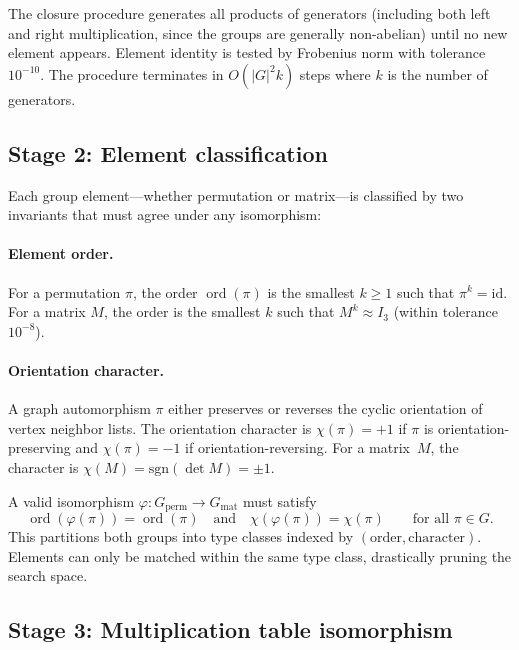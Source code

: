 \documentclass[11pt]{article}
\DeclareMathOperator{\ord}{ord}
\DeclareMathOperator{\det}{det}
\begin{document}
The closure procedure generates all products of generators (including
both left and right multiplication, since the groups are generally
non-abelian) until no new element appears.  Element identity is tested
by Frobenius norm with tolerance $10^{-10}$.  The procedure terminates
in $O(|G|^2 k)$ steps where $k$ is the number of generators.

\subsection{Stage 2: Element classification}
\label{sec:classification}

Each group element---whether permutation or matrix---is classified by
two invariants that must agree under any isomorphism:

\paragraph{Element order.}
For a permutation $\pi$, the order $\ord(\pi)$ is the smallest
$k \geq 1$ such that $\pi^k = \mathrm{id}$.  For a matrix $M$, the
order is the smallest $k$ such that $M^k \approx I_3$ (within
tolerance~$10^{-8}$).

\paragraph{Orientation character.}
A graph automorphism $\pi$ either preserves or reverses the cyclic
orientation of vertex neighbor lists.  The orientation character is
$\chi(\pi) = +1$ if $\pi$ is orientation-preserving and $\chi(\pi) = -1$
if orientation-reversing.  For a matrix~$M$, the character is
$\chi(M) = \mathrm{sgn}(\det M) = \pm 1$.

A valid isomorphism $\varphi : G_{\text{perm}} \to G_{\text{mat}}$ must
satisfy
\begin{equation}
  \label{eq:class-constraint}
  \ord(\varphi(\pi)) = \ord(\pi)
  \quad \text{and} \quad
  \chi(\varphi(\pi)) = \chi(\pi)
  \qquad \text{for all } \pi \in G.
\end{equation}
This partitions both groups into type classes indexed by
$(\text{order}, \text{character})$.  Elements can only be matched within
the same type class, drastically pruning the search space.

\subsection{Stage 3: Multiplication table isomorphism}
\label{sec:isomorphism}
\end{document}
